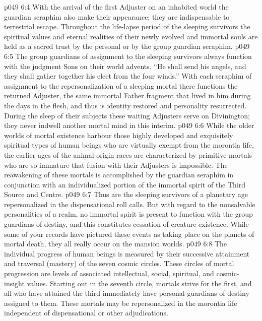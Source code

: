 \vs p049 6:4 \bibnobreakspace {} With the arrival of the first Adjuster on an inhabited world the guardian seraphim also make their appearance; they are indispensable to terrestrial escape. Throughout the life\hyp{}lapse period of the sleeping survivors the spiritual values and eternal realities of their newly evolved and immortal souls are held as a sacred trust by the personal or by the group guardian seraphim.
\vs p049 6:5 The group guardians of assignment to the sleeping survivors always function with the judgment Sons on their world advents. “He shall send his angels, and they shall gather together his elect from the four winds.” With each seraphim of assignment to the repersonalization of a sleeping mortal there functions the returned Adjuster, the same immortal Father fragment that lived in him during the days in the flesh, and thus is identity restored and personality resurrected. During the sleep of their subjects these waiting Adjusters serve on Divinington; they never indwell another mortal mind in this interim.
\vs p049 6:6 While the older worlds of mortal existence harbour those highly developed and exquisitely spiritual types of human beings who are virtually exempt from the morontia life, the earlier ages of the animal\hyp{}origin races are characterized by primitive mortals who are so immature that fusion with their Adjusters is impossible. The reawakening of these mortals is accomplished by the guardian seraphim in conjunction with an individualized portion of the immortal spirit of the Third Source and Centre.
\vs p049 6:7 Thus are the sleeping survivors of a planetary age repersonalized in the dispensational roll calls. But with regard to the nonsalvable personalities of a realm, no immortal spirit is present to function with the group guardians of destiny, and this constitutes cessation of creature existence. While some of your records have pictured these events as taking place on the planets of mortal death, they all really occur on the mansion worlds.
\vs p049 6:8 \bibnobreakspace {} The individual progress of human beings is measured by their successive attainment and traversal (mastery) of the seven cosmic circles. These circles of mortal progression are levels of associated intellectual, social, spiritual, and cosmic\hyp{}insight values. Starting out in the seventh circle, mortals strive for the first, and all who have attained the third immediately have personal guardians of destiny assigned to them. These mortals may be repersonalized in the morontia life independent of dispensational or other adjudications.
